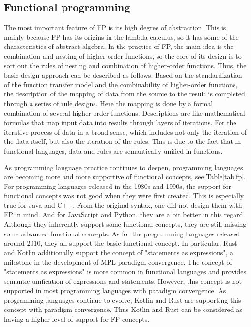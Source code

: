 \subsection{Functional programming}

The most important feature of FP is its high degree of abstraction. This is mainly because FP has its origins in the lambda calculus, so it has some of the characteristics of abstract algebra. In the practice of FP, the main idea is the combination and nesting of higher-order functions, so the core of its design is to sort out the rules of nesting and combination of higher-order functions. Thus, the basic design approach can be described as follows. Based on the standardization of the function transfer model and the combinability of higher-order functions, the description of the mapping of data from the source to the result is completed through a series of rule designs. Here the mapping is done by a formal combination of several higher-order functions. Descriptions are like mathematical formulas that map input data into results through layers of iterations. For the iterative process of data in a broad sense, which includes not only the iteration of the data itself, but also the iteration of the rules. This is due to the fact that in functional languages, data and rules are semantically unified in functions.

As programming language practice continues to deepen,
programming languages are becoming more and more supportive
of functional concepts, see Table\ref{tab:fp}.
For programming languages released in the 1980s and 1990s,
the support for functional concepts was not good when they
were first created.
This is especially true for Java and C++.
From the original syntax, one did not design them with FP in mind.
And for JavaScript and Python, they are a bit better in this regard.
Although they inherently support some functional concepts,
they are still missing some advanced functional concepts.
As for the programming languages released around 2010,
they all support the basic functional concept.
In particular, Rust and Kotlin additionally support the concept
of "statements as expressions", a milestone in the development
of MPL paradigm convergence. The concept of "statements as expressions"
is more common in functional languages and provides semantic
unification of expressions and statements. However, this concept
is not supported in most programming languages with paradigm convergence.
As programming languages continue to evolve, Kotlin and Rust
are supporting this concept with paradigm convergence.
Thus Kotlin and Rust can be considered as having a higher
level of support for FP concepts.


